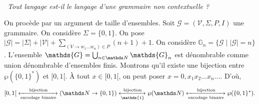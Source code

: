 \begin{rmk}[Digression]~\\[-5mm]
	\begin{center}
		\itshape \guillemotleft~Tout langage est-il le langage d'une grammaire non contextuelle ?~\guillemotright
	\end{center}
	On procède par un argument de taille d'ensembles.
	Soit $\mathcal{G} = (\mathcal{V}, \Sigma, P, I)$ une grammaire. On considère $\Sigma = \{0,1\}$.
	On pose $|\mathcal{G}| = |\Sigma| + |\mathcal{V}| + \sum_{(V \to w_1 \ldots w_n) \in P} (n + 1) + 1$.
	On considère $\mathds{G}_n = \{\mathcal{G}  \mid |\mathcal{G}| = n\}$.
	L'ensemble $\mathds{G} = \bigcup_{n \in \N} \mathds{G}_n$ est dénombrable comme union dénombrable d'ensembles finis.
	Montrons qu'il existe une bijection entre $\wp(\{0,1\}^*)$ et $[0,1[$.
	À tout $x \in [0,1[$, on peut poser $x = 0,x_1x_2\ldots x_n\ldots$.
	D'où, \[
		{[0,1[}\xleftrightarrow[\text{encodage binaire}]{\text{bijection}} (\N \to \{0,1\}) \xleftrightarrow[\mathds{1}]{\text{bijection}} \wp(\N) \xleftrightarrow[\text{encodage binaire}]{\text{bijection}} \wp(\{0,1\}^*)
	.\]
\end{rmk}

